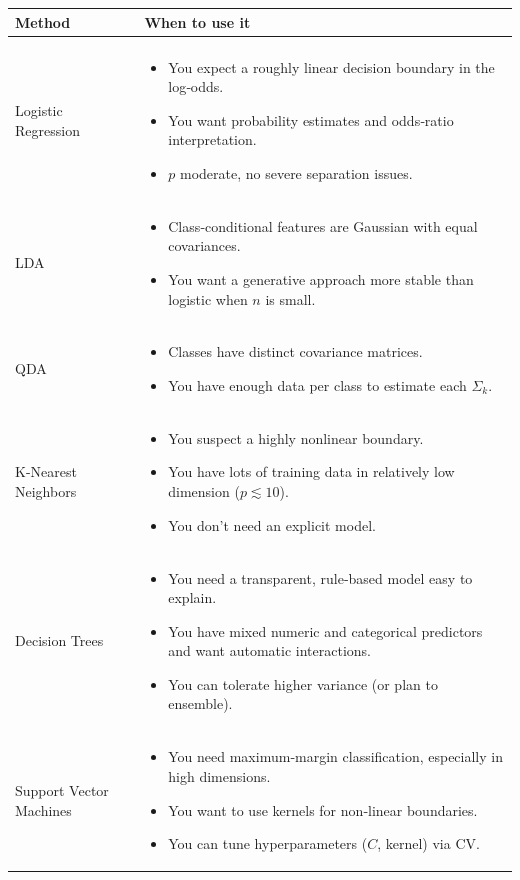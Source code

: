 \documentclass{article}
\begin{document}
\begin{tabular}{p{4cm} p{11cm}}
\textbf{Method} & \textbf{When to use it} \\[6pt]
\hline \\[-6pt]
Logistic Regression &
\begin{itemize}[nosep]
  \item You expect a roughly linear decision boundary in the log‐odds.
  \item You want probability estimates and odds‐ratio interpretation.
  \item \(p\) moderate, no severe separation issues.
\end{itemize}
\\[8pt]
LDA &
\begin{itemize}[nosep]
  \item Class‐conditional features are Gaussian with equal covariances.
  \item You want a generative approach more stable than logistic when \(n\) is small.
\end{itemize}
\\[8pt]
QDA &
\begin{itemize}[nosep]
  \item Classes have distinct covariance matrices.
  \item You have enough data per class to estimate each \(\Sigma_k\).
\end{itemize}
\\[8pt]
K-Nearest Neighbors &
\begin{itemize}[nosep]
  \item You suspect a highly nonlinear boundary.
  \item You have lots of training data in relatively low dimension (\(p\lesssim10\)).
  \item You don’t need an explicit model.
\end{itemize}
\\[8pt]
Decision Trees &
\begin{itemize}[nosep]
  \item You need a transparent, rule‐based model easy to explain.
  \item You have mixed numeric and categorical predictors and want automatic interactions.
  \item You can tolerate higher variance (or plan to ensemble).
\end{itemize}
\\[8pt]
Support Vector Machines &
\begin{itemize}[nosep]
  \item You need maximum‐margin classification, especially in high dimensions.
  \item You want to use kernels for non‐linear boundaries.
  \item You can tune hyperparameters (\(C\), kernel) via CV.
\end{itemize}
\end{tabular}
\end{document}

